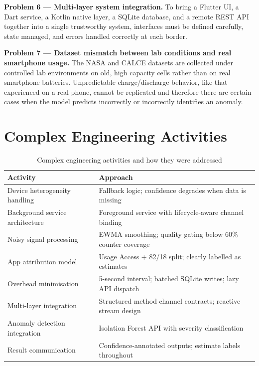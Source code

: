 \documentclass[12pt,a4paper]{report}
\begin{document}
\textbf{Problem 6 — Multi-layer system integration.}
To bring a Flutter UI, a Dart service, a Kotlin native layer, a SQLite database, and a
remote REST API together into a single trustworthy system, interfaces must be defined
carefully, state managed, and errors handled correctly at each border.

\textbf{Problem 7 — Dataset mismatch between lab conditions and real smartphone usage.}
The NASA and CALCE datasets are collected under controlled lab environments on old, high capacity cells rather than on real smartphone batteries. Unpredictable charge/discharge behavior, like that experienced on a real phone, cannot be replicated and therefore there are certain cases when the model predicts incorrectly or incorrectly identifies an anomaly.

\section{Complex Engineering Activities}

\begin{table}[H]
\caption{Complex engineering activities and how they were addressed}
\centering
\small
\begin{tabular}{ll}
\toprule
\textbf{Activity} & \textbf{Approach}\\
\midrule
Device heterogeneity handling    & Fallback logic; confidence degrades when data is missing\\
Background service architecture  & Foreground service with lifecycle-aware channel binding\\
Noisy signal processing          & EWMA smoothing; quality gating below 60\% counter coverage\\
App attribution model            & Usage Access + 82/18 split; clearly labelled as estimates\\
Overhead minimisation            & 5-second interval; batched SQLite writes; lazy API dispatch\\
Multi-layer integration          & Structured method channel contracts; reactive stream design\\
Anomaly detection integration    & Isolation Forest API with severity classification\\
Result communication             & Confidence-annotated outputs; estimate labels throughout\\
\bottomrule
\end{tabular}
\end{table}
\end{document}
